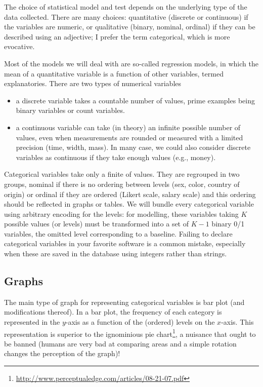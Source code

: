 \documentclass[
  11pt,
  letterpaper,
]{book}
\providecommand{\tightlist}{%
  \setlength{\itemsep}{0pt}\setlength{\parskip}{0pt}}
\renewcommand{\href}[2]{#2\footnote{\url{#1}}}
\theoremstyle{definition}
\theoremstyle{definition}
\theoremstyle{definition}
\theoremstyle{remark}
\begin{document}
The choice of statistical model and test depends on the underlying type of the data collected. There are many choices: quantitative (discrete or continuous) if the variables are numeric, or qualitative (binary, nominal, ordinal) if they can be described using an adjective; I prefer the term categorical, which is more evocative.

Most of the models we will deal with are so-called regression models, in which the mean of a quantitative variable is a function of other variables, termed explanatories. There are two types of numerical variables

\begin{itemize}
\tightlist
\item
  a discrete variable takes a countable number of values, prime examples being binary variables or count variables.
\item
  a continuous variable can take (in theory) an infinite possible number of values, even when measurements are rounded or measured with a limited precision (time, width, mass). In many case, we could also consider discrete variables as continuous if they take enough values (e.g., money).
\end{itemize}

Categorical variables take only a finite of values. They are regrouped in two groups, nominal if there is no ordering between levels (sex, color, country of origin) or ordinal if they are ordered (Likert scale, salary scale) and this ordering should be reflected in graphs or tables. We will bundle every categorical variable using arbitrary encoding for the levels: for modelling, these variables taking \(K\) possible values (or levels) must be transformed into a set of \(K-1\) binary 0/1 variables, the omitted level corresponding to a baseline. Failing to declare categorical variables in your favorite software is a common mistake, especially when these are saved in the database using integers rather than strings.

\hypertarget{graphs}{%
\subsection{Graphs}\label{graphs}}

The main type of graph for representing categorical variables is bar plot (and modifications thereof). In a bar plot, the frequency of each category is represented in the \(y\)-axis as a function of the (ordered) levels on the \(x\)-axis. This representation is superior to the \href{http://www.perceptualedge.com/articles/08-21-07.pdf}{ignominious pie chart}, a nuisance that ought to be banned (humans are very bad at comparing areas and a simple rotation changes the perception of the graph)!
\end{document}
